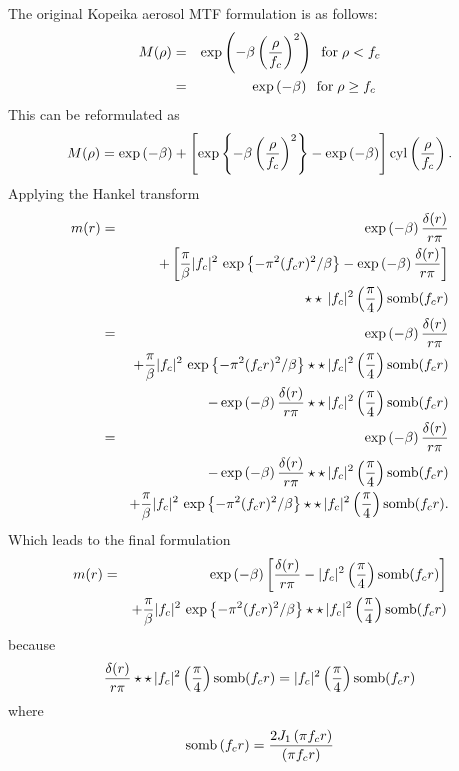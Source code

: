 \documentclass[a4]{article}
\begin{document}
The original Kopeika aerosol MTF formulation is as follows:
\begin{eqnarray}
M(\rho)
&=&\exp\left(-\beta\left(\frac{\rho}{f_c}\right)^2\right) 
   \;\;{\rm for}\; \rho < f_c\nonumber\\
&=&\exp\left(-\beta\right) 
   \;\;{\rm for}\; \rho \ge f_c\
\end{eqnarray}
This can be reformulated as
\begin{equation}
M(\rho)=
\exp\left(-\beta\right) + \left[\exp\left\{-\beta\left(\frac{\rho}{f_c}\right)^2\right\}- \exp\left(-\beta\right) \right]
{\rm cyl}\left(\frac{\rho}{f_c}\right).
\end{equation}
Applying the Hankel transform
\begin{eqnarray}
m(r)&=&
\exp\left(-\beta\right)\frac{\delta(r)}{r\pi}  \nonumber\\
&&+\left[\frac{\pi}{\beta} |f_c|^2\,\exp\left\{-\pi^2 (f_c r)^2/\beta\right\}- \exp\left(-\beta\right)\frac{\delta(r)}{r\pi} \right]\nonumber\\
&&\star\star\, 
|f_c|^2\left(\frac{\pi}{4}\right){\rm somb}(f_c r) \nonumber\\
&=&
\exp\left(-\beta\right)\frac{\delta(r)}{r\pi}  \nonumber\\
&&+\frac{\pi}{\beta} |f_c|^2\,\exp\left\{-\pi^2 (f_c r)^2/\beta\right\}\star\star\, 
|f_c|^2\left(\frac{\pi}{4}\right){\rm somb}(f_c r) \nonumber\\
&&- \exp\left(-\beta\right)\frac{\delta(r)}{r\pi} \star\star\, 
|f_c|^2\left(\frac{\pi}{4}\right){\rm somb}(f_c r) \nonumber\\
&=&
\exp\left(-\beta\right)\frac{\delta(r)}{r\pi}  \nonumber\\
&&- \exp\left(-\beta\right)\frac{\delta(r)}{r\pi} \star\star\, 
|f_c|^2\left(\frac{\pi}{4}\right){\rm somb}(f_c r) \nonumber\\
&&+\frac{\pi}{\beta} |f_c|^2\,\exp\left\{-\pi^2 (f_c r)^2/\beta\right\}\star\star\, 
|f_c|^2\left(\frac{\pi}{4}\right){\rm somb}(f_c r). \nonumber
\end{eqnarray}
Which leads to the final formulation
\begin{eqnarray}
m(r)&=&
\exp\left(-\beta\right)
\left[
\frac{\delta(r)}{r\pi} - 
|f_c|^2\left(\frac{\pi}{4}\right){\rm somb}(f_c r) \right]\nonumber\\
&&+\frac{\pi}{\beta} |f_c|^2\,\exp\left\{-\pi^2 (f_c r)^2/\beta\right\}\star\star\, 
|f_c|^2\left(\frac{\pi}{4}\right){\rm somb}(f_c r) 
\end{eqnarray}
because
\begin{displaymath}
\frac{\delta(r)}{r\pi} \star\star\, 
|f_c|^2\left(\frac{\pi}{4}\right){\rm somb}(f_c r)
=|f_c|^2\left(\frac{\pi}{4}\right){\rm somb}(f_c r)
\end{displaymath}
where
\begin{equation}
{\rm somb}\left(f_c r\right)=
\frac{2J_1\left(\pi f_c r\right)}{\left(\pi f_c r\right)}
\end{equation}
\end{document}
